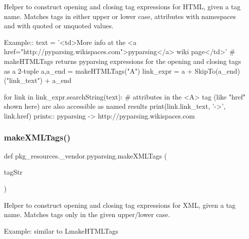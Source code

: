 \begin{DoxyVerb}Helper to construct opening and closing tag expressions for HTML, given a tag name. Matches
tags in either upper or lower case, attributes with namespaces and with quoted or unquoted values.

Example::
    text = '<td>More info at the <a href="http://pyparsing.wikispaces.com">pyparsing</a> wiki page</td>'
    # makeHTMLTags returns pyparsing expressions for the opening and closing tags as a 2-tuple
    a,a_end = makeHTMLTags("A")
    link_expr = a + SkipTo(a_end)("link_text") + a_end
    
    for link in link_expr.searchString(text):
        # attributes in the <A> tag (like "href" shown here) are also accessible as named results
        print(link.link_text, '->', link.href)
prints::
    pyparsing -> http://pyparsing.wikispaces.com
\end{DoxyVerb}
 \mbox{\label{namespacepkg__resources_1_1__vendor_1_1pyparsing_a58ebefe84f26e90a326ca2e2e9ebaf30}} 
\subsubsection{\texorpdfstring{make\+X\+M\+L\+Tags()}{makeXMLTags()}}
{\footnotesize\ttfamily def pkg\+\_\+resources.\+\_\+vendor.\+pyparsing.\+make\+X\+M\+L\+Tags (\begin{DoxyParamCaption}\item[{}]{tag\+Str }\end{DoxyParamCaption})}

\begin{DoxyVerb}Helper to construct opening and closing tag expressions for XML, given a tag name. Matches
tags only in the given upper/lower case.

Example: similar to L{makeHTMLTags}
\end{DoxyVerb}
 \mbox{\label{namespacepkg__resources_1_1__vendor_1_1pyparsing_a4f253c68f289eabac564e163ebf51687}} 

